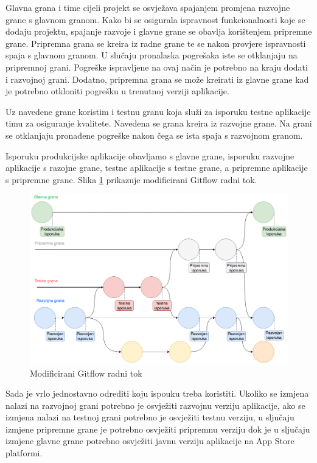 \documentclass[times, utf8, diplomski, numeric]{fer}
\begin{document}
\begin{appendices}
Glavna grana i time cijeli projekt se osvježava spajanjem promjena razvojne grane s glavnom granom. Kako bi se osigurala ispravnost funkcionalnosti koje se dodaju projektu, spajanje razvoje i glavne grane se obavlja korištenjem pripremne grane. Pripremna grana se kreira iz radne grane te se nakon provjere ispravnosti spaja s glavnom granom. U slučaju pronalaska pogrešaka iste se otklanjaju na pripremnoj grani. Pogreške ispravljene na ovaj način je potrebno na kraju dodati i razvojnoj grani. Dodatno, pripremna grana se može kreirati iz glavne grane kad je potrebno otkloniti pogrešku u trenutnoj verziji aplikacije.

Uz navedene grane koristim i testnu granu koja služi za isporuku testne aplikacije timu za osiguranje kvalitete. Navedena se grana kreira iz razvojne grane. Na grani se otklanjaju pronađene pogreške nakon čega se ista spaja s razvojnom granom.

Isporuku produkcijske aplikacije obavljamo s glavne grane, isporuku razvojne aplikacije s razojne grane, testne aplikacije s testne grane, a pripremne aplikacije s pripremne grane. Slika \ref{fig:ModificiraniGitflowTokRaka} prikazuje modificirani Gitflow radni tok.

\begin{figure}
\centering
\includegraphics[scale=0.4]{ModificiraniGitflowTokRaka}
\caption{Modificirani Gitflow radni tok}
\label{fig:ModificiraniGitflowTokRaka}
\end{figure}

Sada je vrlo jednostavno odrediti koju ispouku treba koristiti. Ukoliko se izmjena nalazi na razvojnoj grani potrebno je osvježiti razvojnu verziju aplikacije, ako se izmjena nalazi na testnoj grani potrebno je osvježiti testnu verziju, u sljučaju izmjene pripremne grane je potrebno osvježiti pripremnu verziju dok je u sljučaju izmjene glavne grane potrebno osvježiti javnu verziju aplikacije na App Store platformi.


\end{appendices}
\end{document}
